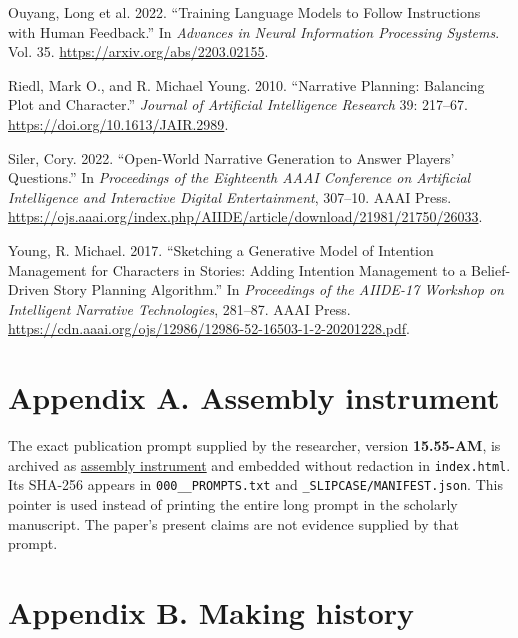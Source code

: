 \documentclass[
  11pt,
  letterpaper,
]{article}
\newlength{\cslhangindent}
\newenvironment{CSLReferences}[2] %
 {\begin{list}{}{%
  \setlength{\itemindent}{0pt}
  \setlength{\leftmargin}{0pt}
  \setlength{\parsep}{0pt}
  \ifodd #1
   \setlength{\leftmargin}{\cslhangindent}
   \setlength{\itemindent}{-1\cslhangindent}
  \fi
  \setlength{\itemsep}{#2\baselineskip}}}
 {\end{list}}
\begin{document}
\begin{CSLReferences}{1}{0}
Ouyang, Long et al. 2022. {``Training Language Models to Follow
Instructions with Human Feedback.''} In \emph{Advances in Neural
Information Processing Systems}. Vol. 35.
\url{https://arxiv.org/abs/2203.02155}.

Riedl, Mark O., and R. Michael Young. 2010. {``Narrative Planning:
Balancing Plot and Character.''} \emph{Journal of Artificial
Intelligence Research} 39: 217--67.
\url{https://doi.org/10.1613/JAIR.2989}.

Siler, Cory. 2022. {``Open-World Narrative Generation to Answer Players'
Questions.''} In \emph{Proceedings of the Eighteenth AAAI Conference on
Artificial Intelligence and Interactive Digital Entertainment}, 307--10.
AAAI Press.
\url{https://ojs.aaai.org/index.php/AIIDE/article/download/21981/21750/26033}.

Young, R. Michael. 2017. {``Sketching a Generative Model of Intention
Management for Characters in Stories: Adding Intention Management to a
Belief-Driven Story Planning Algorithm.''} In \emph{Proceedings of the
AIIDE-17 Workshop on Intelligent Narrative Technologies}, 281--87. AAAI
Press.
\url{https://cdn.aaai.org/ojs/12986/12986-52-16503-1-2-20201228.pdf}.

\end{CSLReferences}

\section{Appendix A. Assembly
instrument}\label{appendix-a.-assembly-instrument}

The exact publication prompt supplied by the researcher, version
\textbf{15.55-AM}, is archived as
\href{_PROMPTS/assembly_slipcase_v15.55-AM.xml}{assembly instrument} and
embedded without redaction in \texttt{index.html}. Its SHA-256 appears
in \texttt{000\_\_PROMPTS.txt} and \texttt{\_SLIPCASE/MANIFEST.json}.
This pointer is used instead of printing the entire long prompt in the
scholarly manuscript. The paper's present claims are not evidence
supplied by that prompt.

\section{Appendix B. Making history}\label{appendix-b.-making-history}
\end{document}
